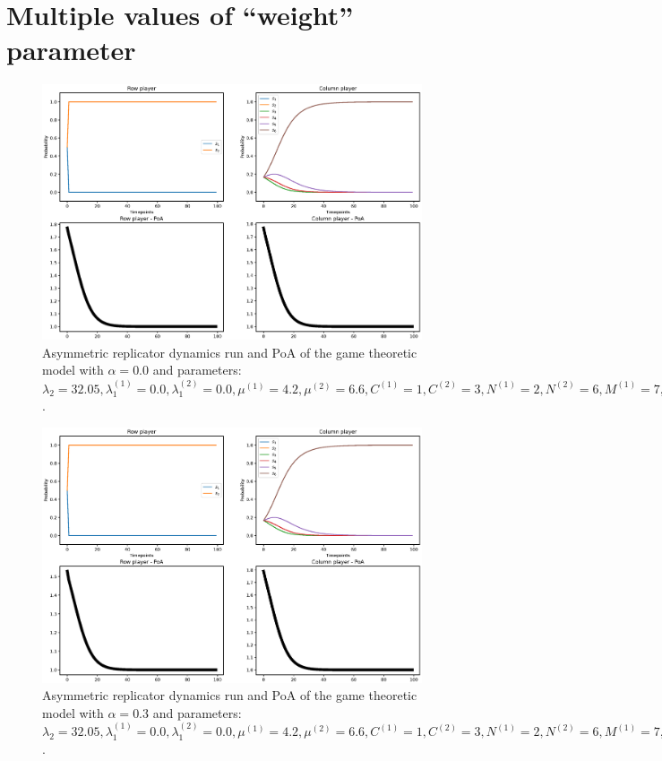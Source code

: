 \section{Multiple values of ``weight'' parameter}\label{app:b_2}


\begin{figure}[H]
    \includegraphics[width=\textwidth, trim = 0 60 0 60, clip]{chapters/00_appendix/02_more_game_results/Bin/poa_ard_alpha_0.eps}
    \caption{Asymmetric replicator dynamics run and PoA of the game theoretic
    model with \(\alpha = 0.0\) and parameters: \(\lambda_2 = 32.05,
    \lambda_1^{(1)} = 0.0, \lambda_1^{(2)} = 0.0, \mu^{(1)} = 4.2,
    \mu^{(2)} = 6.6, C^{(1)} = 1, C^{(2)} = 3, N^{(1)} = 2, N^{(2)} = 6,
    M^{(1)} = 7, M^{(2)} = 4, t = 2.0\).}
    \label{fig:poa_ard_alpha_0}
\end{figure}



\begin{figure}[H]
    \includegraphics[width=\textwidth, trim = 0 60 0 60, clip]{chapters/00_appendix/02_more_game_results/Bin/poa_ard_alpha_03.eps}
    \caption{Asymmetric replicator dynamics run and PoA of the game theoretic
    model with \(\alpha = 0.3\) and parameters: \(\lambda_2 = 32.05,
    \lambda_1^{(1)} = 0.0, \lambda_1^{(2)} = 0.0, \mu^{(1)} = 4.2,
    \mu^{(2)} = 6.6, C^{(1)} = 1, C^{(2)} = 3, N^{(1)} = 2, N^{(2)} = 6,
    M^{(1)} = 7, M^{(2)} = 4, t = 2.0\).}
    \label{fig:poa_ard_alpha_03}
\end{figure}




